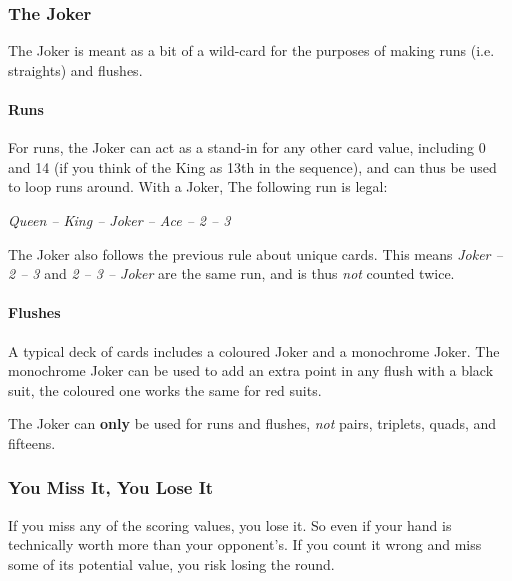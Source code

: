 \documentclass{article}
\begin{document}
\subsubsection{The Joker}
The Joker is meant as a bit of a wild-card for the purposes of making runs (i.e. straights) and flushes.

\paragraph{Runs} For runs, the Joker can act as a stand-in for any other card value, including 0 and 14 (if you think of the King as 13th in the sequence), and can thus be used to loop runs around. 
With a Joker, The following run is legal:
\begin{center}
    \textit{Queen -- King -- Joker -- Ace -- 2 -- 3}
\end{center}

The Joker also follows the previous rule about unique cards.
This means \textit{Joker -- 2 -- 3} and \textit{2 -- 3 -- Joker} are the same run, and is thus \textit{not} counted twice.

\paragraph{Flushes} A typical deck of cards includes a coloured Joker and a monochrome Joker. 
The monochrome Joker can be used to add an extra point in any flush with a black suit, the coloured one works the same for red suits.

\note The Joker can \textbf{only} be used for runs and flushes, \textit{not} pairs, triplets, quads, and fifteens.

\subsubsection{You Miss It, You Lose It}
If you miss any of the scoring values, you lose it. So even if your hand is technically worth more than your opponent's. If you count it wrong and miss some of its potential value, you risk losing the round.
\end{document}
